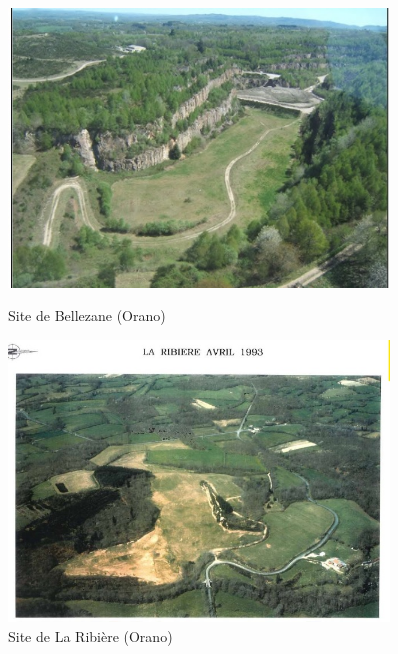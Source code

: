 \documentclass{article}
\begin{document}

\begin{figure}[!ht]
    \centering
    \begin{minipage}{0.5\textwidth}
        \centering
        \includegraphics[width=0.9\textwidth]{I_A_3.jpg} 
        \caption{Site de Bellezane (Orano)}
        \label{fig:bellezane1}
    \end{minipage}\hfill
    \begin{minipage}{0.5\textwidth}
        \centering
        \includegraphics[width=0.9\textwidth]{I_A_4.jpg} 
        \caption{Site de La Ribière (Orano)}
        \label{fig:ribiere1}
    \end{minipage}
\end{figure}
\end{document}
